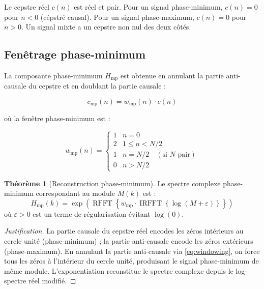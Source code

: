 \documentclass[12pt, a4paper]{article}
\theoremstyle{definition}
\newtheorem{theoreme}{Théorème}[section]
\DeclareMathOperator{\irfft}{IRFFT}
\DeclareMathOperator{\rfft}{RFFT}
\begin{document}
Le cepstre réel $c(n)$ est réel et pair. Pour un signal phase-minimum,
$c(n) = 0$ pour $n < 0$ (cépstré causal). Pour un signal phase-maximum,
$c(n) = 0$ pour $n > 0$. Un signal mixte a un cepstre non nul des deux côtés.

\subsection{Fenêtrage phase-minimum}

La composante phase-minimum $H_{\mathrm{mp}}$ est obtenue en annulant la partie
anti-causale du cepstre et en doublant la partie causale :

\begin{equation}
  c_{\mathrm{mp}}(n) = w_{\mathrm{mp}}(n) \cdot c(n)
  \label{eq:windowing}
\end{equation}

où la fenêtre phase-minimum est :

\begin{equation}
  w_{\mathrm{mp}}(n) =
  \begin{cases}
    1  & n = 0 \\
    2  & 1 \leq n < N/2 \\
    1  & n = N/2 \quad (\text{si } N \text{ pair}) \\
    0  & n > N/2
  \end{cases}
  \label{eq:window}
\end{equation}

\begin{theoreme}[Reconstruction phase-minimum]
  Le spectre complexe phase-minimum correspondant au module $M(k)$ est :
  \begin{equation}
    \boxed{
    H_{\mathrm{mp}}(k) = \exp\!\left(\rfft\!\left\{w_{\mathrm{mp}} \cdot
    \irfft\!\left\{\log(M + \varepsilon)\right\}\right\}\right)
    }
    \label{eq:reconstruction}
  \end{equation}
  où $\varepsilon > 0$ est un terme de régularisation évitant $\log(0)$.
\end{theoreme}

\begin{proof}[Justification]
  La partie causale du cepstre réel encodes les zéros intérieurs au cercle
  unité (phase-minimum) ; la partie anti-causale encode les zéros extérieurs
  (phase-maximum). En annulant la partie anti-causale via \eqref{eq:windowing},
  on force tous les zéros à l'intérieur du cercle unité, produisant le signal
  phase-minimum de même module. L'exponentiation reconstitue le spectre
  complexe depuis le log-spectre réel modifié.
\end{proof}
\end{document}
